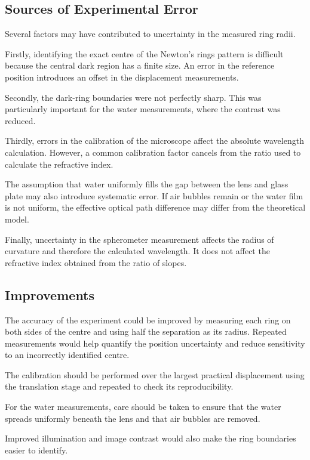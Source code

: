 \documentclass[12pt,a4paper]{article}
\begin{document}
\subsection{Sources of Experimental Error}

Several factors may have contributed to uncertainty in the measured ring radii.

Firstly, identifying the exact centre of the Newton's rings pattern is difficult because the central dark region has a finite size. An error in the reference position introduces an offset in the displacement measurements.

Secondly, the dark-ring boundaries were not perfectly sharp. This was particularly important for the water measurements, where the contrast was reduced.

Thirdly, errors in the calibration of the microscope affect the absolute wavelength calculation. However, a common calibration factor cancels from the ratio used to calculate the refractive index.

The assumption that water uniformly
fills the gap between the lens and
glass plate may also introduce
systematic error. If air bubbles
remain or the water film is not
uniform, the effective optical
path difference may differ from
the theoretical model.

Finally, uncertainty in the
spherometer measurement affects
the radius of curvature and
therefore the calculated wavelength.
It does not affect the refractive
index obtained from the ratio
of slopes.

\subsection{Improvements}

The accuracy of the experiment
could be improved by measuring
each ring on both sides of the
centre and using half the
separation as its radius. Repeated
measurements would help quantify
the position uncertainty and
reduce sensitivity to an
incorrectly identified centre.

The calibration should be performed
over the largest practical
displacement using the translation
stage and repeated to check
its reproducibility.

For the water measurements,
care should be taken to ensure
that the water spreads uniformly
beneath the lens and that air
bubbles are removed.

Improved illumination and image
contrast would also make the
ring boundaries easier to identify.
\end{document}
